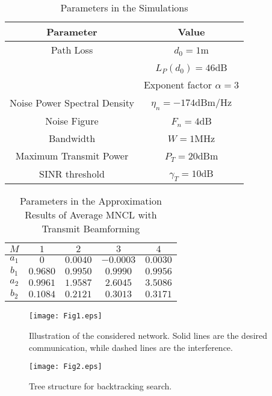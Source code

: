 \documentclass[draftcls,onecolumn,peerview,12pt]{IEEEtran}
\begin{document}



\newpage
\begin{table}
\caption{Parameters in the Simulations} \centering \label{table I}
\begin{tabular}{c||c}
\hline \textbf{Parameter} & \textbf{Value} \\
\hline \textrm{Path Loss} & $d_{0}=1$\textrm{m} \\
                          & $L_P(d_0)=46$\textrm{dB} \\
                          & \textrm{Exponent factor} $\alpha=3$ \\
\hline \textrm{Noise Power Spectral Density} & $\eta_n=-174$\textrm{dBm/Hz} \\
\hline \textrm{Noise Figure} & $F_n=4$\textrm{dB} \\
\hline \textrm{Bandwidth} & $W=1$\textrm{MHz} \\
\hline \textrm{Maximum Transmit Power} & $P_T=20$\textrm{dBm} \\
\hline \textrm{SINR threshold} &$\gamma_{T}=10$\textrm{dB} \\
\hline
\end{tabular}
\end{table}

\begin{table}
\caption{Parameters in the Approximation Results of Average MNCL
with Transmit Beamforming} \centering \label{table II}
\begin{tabular}{|c|c|c|c|c|}
\hline $M$ & $1$ & $2$ & $3$ & $4$ \\
\hline
\hline $a_1$ & $0$ & $0.0040$ & $-0.0003$ & $0.0030$ \\
\hline $b_1$ & $0.9680$ & $0.9950$ & $0.9990$ & $0.9956$ \\
\hline $a_2$ & $0.9961$ & $1.9587$ & $2.6045$ & $3.5086$ \\
\hline $b_2$ & $0.1084$ & $0.2121$ & $0.3013$ & $0.3171$ \\
\hline
\end{tabular}
\end{table}

\begin{figure}
\centering
\texttt{[image: Fig1.eps]}
\caption{Illustration of the considered network. Solid lines are the
desired communication, while dashed lines are the interference.}
\label{Fig1}
\end{figure}

\begin{figure}
\centering
\texttt{[image: Fig2.eps]}
\caption{Tree structure for backtracking search.} \label{Fig2}
\end{figure}
\end{document}
